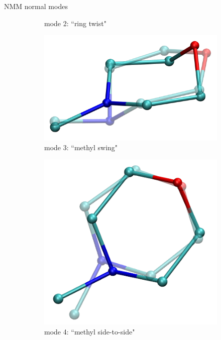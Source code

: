 \documentclass{beamer}
\begin{document}
\begin{frame}{NMM normal modes}
\begin{figure}
\begin{subfigure}{\x\textwidth}
			\caption{mode 2: ``ring twist"}
		\end{subfigure}	
		\begin{subfigure}{\x\textwidth}
				\includegraphics[width=\textwidth]{mode3_ot.png}
				\caption{mode 3: ``methyl swing"}
		\end{subfigure}
		\begin{subfigure}{\x\textwidth}
			\includegraphics[width=\textwidth]{mode4_ot.png}
			\caption{mode 4: ``methyl side-to-side"}
		\end{subfigure}
		\begin{subfigure}{\x\textwidth}

\end{subfigure}
\end{figure}
\end{frame}
\end{document}
